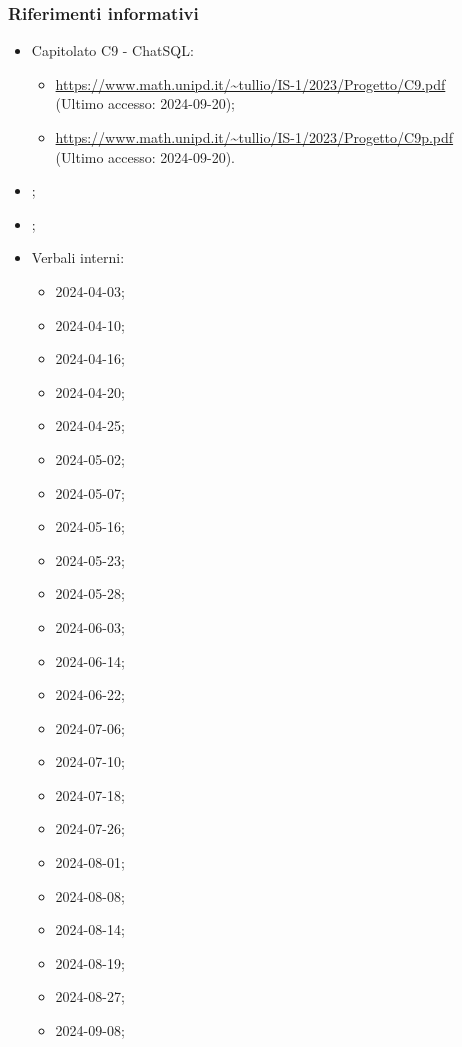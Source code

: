 \subsubsection{Riferimenti informativi}
\begin{itemize}
  \item Capitolato C9 - ChatSQL:
  \begin{itemize}
    \item \href{https://www.math.unipd.it/~tullio/IS-1/2023/Progetto/C9.pdf}{https://www.math.unipd.it/\textasciitilde tullio/IS-1/2023/Progetto/C9.pdf} \\ (Ultimo accesso: 2024-09-20);
    \item \href{https://www.math.unipd.it/~tullio/IS-1/2023/Progetto/C9p.pdf}{https://www.math.unipd.it/\textasciitilde tullio/IS-1/2023/Progetto/C9p.pdf} \\ (Ultimo accesso: 2024-09-20).
  \end{itemize}
  \item \AnalisiDeiRequisiti;
  \item \Glossario;
  \item Verbali interni:
  \begin{itemize}
    \item 2024-04-03;
    \item 2024-04-10;
    \item 2024-04-16;
    \item 2024-04-20;
    \item 2024-04-25;
    \item 2024-05-02;
    \item 2024-05-07;
    \item 2024-05-16;
    \item 2024-05-23;
    \item 2024-05-28;
    \item 2024-06-03;
    \item 2024-06-14;
    \item 2024-06-22;
    \item 2024-07-06;
    \item 2024-07-10;
    \item 2024-07-18;
    \item 2024-07-26;
    \item 2024-08-01;
    \item 2024-08-08;
    \item 2024-08-14;
    \item 2024-08-19;
    \item 2024-08-27;
    \item 2024-09-08;

\end{itemize}
\end{itemize}
